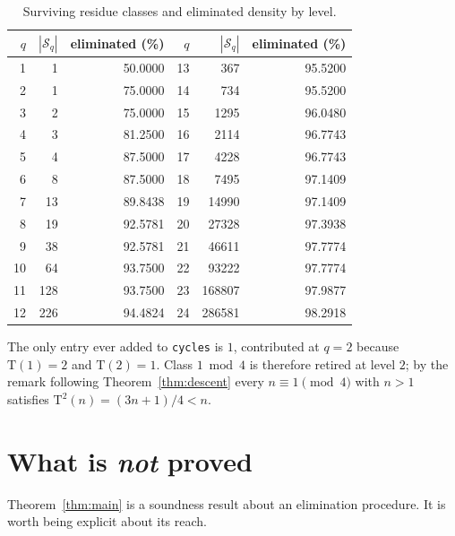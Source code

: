 \documentclass[11pt,a4paper]{article}
\theoremstyle{plain}
\theoremstyle{definition}
\newcommand{\Tmap}{\mathrm{T}}
\newcommand{\Slev}{\mathcal{S}}
\begin{document}
\begin{table}[htb]
\centering
\small
\begin{tabular}{@{}rrr@{\hskip 3em}rrr@{}}
\toprule
$q$ & $|\Slev_{q}|$ & eliminated (\%) & $q$ & $|\Slev_{q}|$ & eliminated (\%) \\
\midrule
1 & 1 & 50.0000 & 13 & 367 & 95.5200 \\
2 & 1 & 75.0000 & 14 & 734 & 95.5200 \\
3 & 2 & 75.0000 & 15 & 1295 & 96.0480 \\
4 & 3 & 81.2500 & 16 & 2114 & 96.7743 \\
5 & 4 & 87.5000 & 17 & 4228 & 96.7743 \\
6 & 8 & 87.5000 & 18 & 7495 & 97.1409 \\
7 & 13 & 89.8438 & 19 & 14990 & 97.1409 \\
8 & 19 & 92.5781 & 20 & 27328 & 97.3938 \\
9 & 38 & 92.5781 & 21 & 46611 & 97.7774 \\
10 & 64 & 93.7500 & 22 & 93222 & 97.7774 \\
11 & 128 & 93.7500 & 23 & 168807 & 97.9877 \\
12 & 226 & 94.4824 & 24 & 286581 & 98.2918 \\
\bottomrule
\end{tabular}
\caption{Surviving residue classes and eliminated density by level.}
\label{tab:data}
\end{table}

The only entry ever added to \texttt{cycles} is $1$, contributed at $q=2$
because $\Tmap(1) = 2$ and $\Tmap(2) = 1$. Class $1 \bmod 4$ is therefore
retired at level $2$; by the remark following Theorem~\ref{thm:descent} every
$n \equiv 1 \pmod 4$ with $n > 1$ satisfies $\Tmap^{2}(n) = (3n+1)/4 < n$.

\section{What is \emph{not} proved}
\label{sec:limits}

Theorem~\ref{thm:main} is a soundness result about an elimination procedure.
It is worth being explicit about its reach.
\end{document}

